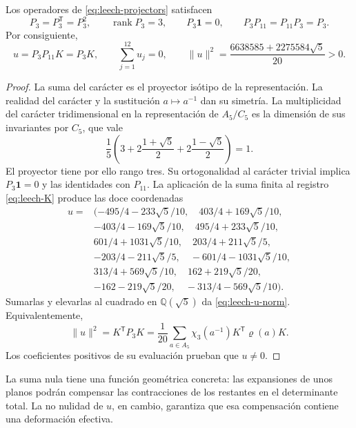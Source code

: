 \begin{lemma}
\label{lem:leech-u}
Los operadores de \eqref{eq:leech-projectors} satisfacen
\[
 P_3=P_3^{\mathsf T}=P_3^2,\qquad
 \operatorname{rank}P_3=3,\qquad P_3\mathbf1=0,\qquad
 P_3P_{11}=P_{11}P_3=P_3.
\]
Por consiguiente,
\begin{equation}
 u=P_3P_{11}K=P_3K,\qquad
 \sum_{j=1}^{12}u_j=0,\qquad
 \|u\|^2=\frac{6638585+2275584\sqrt5}{20}>0.
 \label{eq:leech-u-norm}
\end{equation}
\end{lemma}
\begin{proof}
La suma del carácter es el proyector isótipo de la representación.
La realidad del carácter y la sustitución \(a\mapsto a^{-1}\)
dan su simetría. La multiplicidad del carácter tridimensional en la
representación de \(A_5/C_5\) es la dimensión de sus invariantes por
\(C_5\), que vale
\[
 \frac15\left(
 3+2\frac{1+\sqrt5}{2}+2\frac{1-\sqrt5}{2}
 \right)=1.
\]
El proyector tiene por ello rango tres. Su ortogonalidad al carácter
trivial implica \(P_3\mathbf1=0\) y las identidades con \(P_{11}\).
La aplicación de la suma finita al registro
\eqref{eq:leech-K} produce las doce coordenadas
\begin{equation}
\begin{aligned}
u={}&(-495/4-233\sqrt5/10,\quad403/4+169\sqrt5/10,\\
&-403/4-169\sqrt5/10,\quad495/4+233\sqrt5/10,\\
&601/4+1031\sqrt5/10,\quad203/4+211\sqrt5/5,\\
&-203/4-211\sqrt5/5,\quad-601/4-1031\sqrt5/10,\\
&313/4+569\sqrt5/10,\quad162+219\sqrt5/20,\\
&-162-219\sqrt5/20,\quad-313/4-569\sqrt5/10).
\end{aligned}
\label{eq:leech-u-coordinates}
\end{equation}
Sumarlas y elevarlas al cuadrado en \(\mathbb Q(\sqrt5)\) da
\eqref{eq:leech-u-norm}. Equivalentemente,
\[
 \|u\|^2=K^{\mathsf T}P_3K
 =\frac1{20}\sum_{a\in A_5}
          \chi_3(a^{-1})K^{\mathsf T}\varrho(a)K.
\]
Los coeficientes positivos de su evaluación prueban que \(u\ne0\).
\end{proof}

La suma nula tiene una función geométrica concreta: las expansiones de
unos planos podrán compensar las contracciones de los restantes en el
determinante total. La no nulidad de \(u\), en cambio, garantiza que esa
compensación contiene una deformación efectiva.


